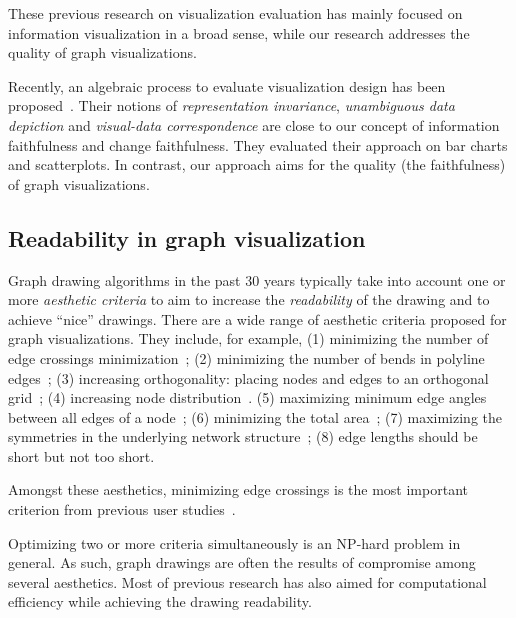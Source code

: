 \documentclass[10pt,journal,cspaper,compsoc]{IEEEtran}
\begin{document}
These previous research on visualization evaluation has mainly focused on information visualization in a broad sense, while our research addresses the quality of graph visualizations.

Recently, an algebraic process to evaluate visualization design has been proposed~\cite{kindlmann2014}. Their notions of  \emph{representation invariance}, \emph{unambiguous data depiction} and \emph{visual-data correspondence} are close to our concept of information faithfulness and change faithfulness. They evaluated their approach on bar charts and scatterplots. 
In contrast, our approach aims for the quality (the faithfulness) of graph visualizations.

\subsection{Readability in graph visualization}
Graph drawing algorithms in the past 30 years typically take into account one or more {\em aesthetic criteria} to aim to increase the \emph{readability} of the drawing and to achieve ``nice'' drawings.
There are a wide range of aesthetic criteria proposed for graph visualizations. They include, for example,
(1) minimizing the number of edge crossings minimization~\cite{reingold1981tidier};
(2) minimizing the number of bends in polyline edges~\cite{reingold1981tidier};
(3) increasing orthogonality: placing nodes and edges to an orthogonal grid~\cite{reingold1981tidier};
(4) increasing node distribution~\cite{tamassia1988automatic,davidson1996drawing}.
(5) maximizing minimum edge angles between all edges of a node~\cite{purchase2002metrics};
(6) minimizing the total area~\cite{tamassia1988automatic};
(7) maximizing the symmetries in the underlying network structure~\cite{north};
(8) edge lengths should be short but not too short\cite{coleman1996aesthetics}.

Amongst these aesthetics,  minimizing edge crossings is the most important criterion from previous user studies~\cite{purchase1997aesthetic}.

Optimizing two or more criteria simultaneously is an NP-hard problem in general. As such, graph drawings are often the results of compromise among several aesthetics. Most of previous research has also aimed for computational efficiency while achieving the drawing readability.
\end{document}

